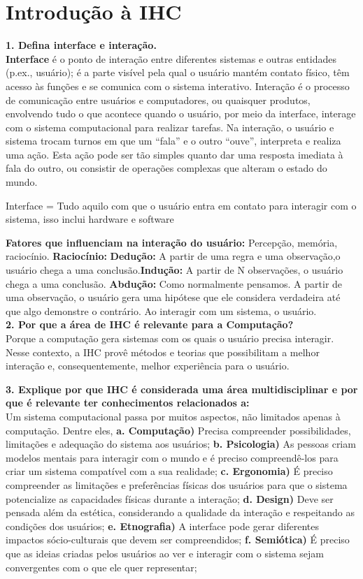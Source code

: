 \documentclass[9pt, twocolumn, article]{memoir}
\begin{document}
\section*{Introdução à IHC}

\textbf{1. Defina interface e interação.}\\
\textbf{Interface} é o ponto de interação entre diferentes sistemas e outras entidades (p.ex., usuário); é a parte visível pela qual o usuário mantém contato físico, têm acesso às funções e se comunica com o sistema interativo. Interação é o processo de comunicação entre usuários e computadores, ou quaisquer produtos, envolvendo tudo o que acontece quando o usuário, por meio da interface, interage com o sistema computacional para realizar tarefas. Na interação, o usuário e sistema trocam turnos em que um “fala” e o outro “ouve”, interpreta e realiza uma ação. Esta ação pode ser tão simples quanto dar uma resposta imediata à fala do outro, ou consistir de operações complexas que alteram o estado do mundo. 

Interface = Tudo aquilo com que o usuário entra em contato para interagir com o sistema, isso inclui hardware e software

\textbf{Fatores que influenciam na interação do usuário: } Percepção, memória, raciocínio. \textbf{Raciocínio: } \textbf{Dedução: } A partir de uma regra e uma observação,o usuário chega a uma conclusão.\textbf{Indução: } A partir de N observações, o usuário chega a uma conclusão.\textbf{ Abdução: } Como normalmente pensamos. A partir de uma observação, o usuário gera uma hipótese que ele considera verdadeira até que algo demonstre o contrário. Ao interagir com um sistema, o usuário.\\

\textbf{2. Por que a área de IHC é relevante para a Computação?}\\
Porque a computação gera sistemas com os quais o usuário precisa interagir. Nesse contexto, a IHC provê métodos e teorias que possibilitam a melhor interação e, consequentemente, melhor experiência para o usuário.

\textbf{3. Explique por que  IHC  é  considerada  uma  área  multidisciplinar  e  por  que  é  relevante  ter conhecimentos relacionados a:}\\
Um sistema computacional passa por muitos aspectos, não limitados apenas à computação. Dentre eles,
\textbf{a. Computação)} Precisa compreender possibilidades, limitações e adequação do sistema aos usuários;
\textbf{b. Psicologia)} As pessoas criam modelos mentais para interagir com o mundo e é preciso compreendê-los para criar um sistema compatível com a sua realidade;
\textbf{c. Ergonomia)} É preciso compreender as limitações e preferências físicas dos usuários para que o sistema potencialize as capacidades físicas durante a interação;
\textbf{d. Design)} Deve ser pensada além da estética, considerando a qualidade da interação e respeitando as condições dos usuários;
\textbf{e. Etnografia)} A interface pode gerar diferentes impactos sócio-culturais que devem ser compreendidos;
\textbf{f. Semiótica)} É preciso que as ideias criadas pelos usuários ao ver e interagir com o sistema sejam convergentes com o que ele quer representar;
\end{document}

